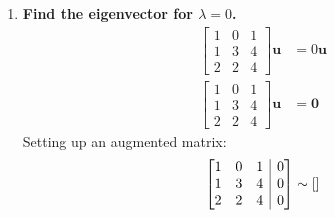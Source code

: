 \documentclass[11pt]{article}
\makeatletter
\newenvironment{amatrix}[1]{%
    \left[\begin{array}{@{}*{#1}{c}|c@{}}
}{%
    \end{array}\right]
}
\makeatother
\begin{document}
\begin{enumerate}[label=\textbf{\arabic*.}]
{\begin{enumerate}[label=\textbf{(\alph*)}]
{\begin{align*}
                        \lambda(\lambda^2-8\lambda+9)&=0
                    \end{align*}
                    One solution is $\lambda=0$; the other two will need the quadratic formula:
                    \begin{align*}
                        \lambda&=\frac{-b\pm\sqrt{b^2-4ac}}{2a} \\
                        &=\frac{8\pm\sqrt{(-8)^2-4(1)(9)}}{2(1)} \\
                        &=\frac{8\pm\sqrt{28}}{2} \\
                        &=4\pm\sqrt{7}
                    \end{align*}
                    So the eigenvalues are $\lambda=0$, $\lambda=4+\sqrt{7}$, and $\lambda=4-\sqrt{7}$.
                }
                \item{
                    \textbf{\boldmath Find the eigenvector for $\lambda=0$.}
                    \begin{align*}
                        \begin{bmatrix}
                            1 & 0 & 1 \\
                            1 & 3 & 4 \\
                            2 & 2 & 4
                        \end{bmatrix}
                        \mathbf{u}
                        &=
                        0\mathbf{u} \\
                        \begin{bmatrix}
                            1 & 0 & 1 \\
                            1 & 3 & 4 \\
                            2 & 2 & 4
                        \end{bmatrix}
                        \mathbf{u}&=\mathbf{0}
                    \end{align*}
                    Setting up an augmented matrix:
                    \begin{gather*}
                        \begin{amatrix}{3}
                            1 & 0 & 1 & 0 \\
                            1 & 3 & 4 & 0 \\
                            2 & 2 & 4 & 0
                        \end{amatrix}
                        \sim
                        \begin{amatrix}{3}

\end{amatrix}
\end{gather*}}
\end{enumerate}}
\end{enumerate}
\end{document}
